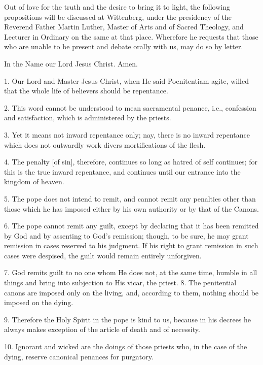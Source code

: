 

Out of love for the truth and the desire to bring it to light, the
following propositions will be discussed at Wittenberg, under the
presidency of the Reverend Father Martin Luther, Master of Arts and of
Sacred Theology, and Lecturer in Ordinary on the same at that place.
Wherefore he requests that those who are unable to be present and
debate orally with us, may do so by letter.

In the Name our Lord Jesus Christ. Amen.

1. Our Lord and Master Jesus Christ, when He said Poenitentiam agite,
willed that the whole life of believers should be repentance.

2. This word cannot be understood to mean sacramental penance, i.e.,
confession and satisfaction, which is administered by the priests.

3. Yet it means not inward repentance only; nay, there is no inward
repentance which does not outwardly work divers mortifications of the
flesh.

4. The penalty [of sin], therefore, continues so long as hatred of self
continues; for this is the true inward repentance, and continues until
our entrance into the kingdom of heaven.

5. The pope does not intend to remit, and cannot remit any penalties
other than those which he has imposed either by his own authority or by
that of the Canons.

6. The pope cannot remit any guilt, except by declaring that it has
been remitted by God and by assenting to God's remission; though, to be
sure, he may grant remission in cases reserved to his judgment. If his
right to grant remission in such cases were despised, the guilt would
remain entirely unforgiven.

7. God remits guilt to no one whom He does not, at the same time,
humble in all things and bring into subjection to His vicar, the
priest. 8. The penitential canons are imposed only on the living, and,
according to them, nothing should be imposed on the dying.

9. Therefore the Holy Spirit in the pope is kind to us, because in his
decrees he always makes exception of the article of death and of
necessity.

10. Ignorant and wicked are the doings of those priests who, in the
case of the dying, reserve canonical penances for purgatory.

